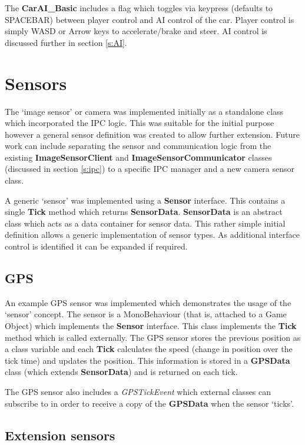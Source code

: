 \documentclass{article}
\begin{document}
The \textbf{CarAI\_Basic} includes a flag which toggles via keypress (defaults to SPACEBAR) between player control and AI control of the car. Player control is simply WASD or Arrow keys to accelerate/brake and steer. AI control is discussed further in section \ref{s:AI}.


\section{Sensors} \label{s:sensors}

The `image sensor' or camera was implemented initially as a standalone class which incorporated the IPC logic. This was suitable for the initial purpose however a general sensor definition was created to allow further extension. Future work can include separating the sensor and communication logic from the existing \textbf{ImageSensorClient} and \textbf{ImageSensorCommunicator} classes (discussed in section \ref{s:ipc}) to a specific IPC manager and a new camera sensor class.

A generic `sensor' was implemented using a \textbf{Sensor} interface. This contains a single \textbf{Tick} method which returns \textbf{SensorData}. \textbf{SensorData} is an abstract class which acts as a data container for sensor data. This rather simple initial definition allows a generic implementation of sensor types. As additional interface control is identified it can be expanded if required. 

\subsection{GPS}

An example GPS sensor was implemented which demonstrates the usage of the `sensor' concept. The sensor is a MonoBehaviour (that is, attached to a Game Object) which implements the \textbf{Sensor} interface. This class implements the \textbf{Tick} method which is called externally. The GPS sensor stores the previous position as a class variable and each \textbf{Tick} calculates the speed (change in position over the tick time) and updates the position. This information is stored in a \textbf{GPSData} class (which extends \textbf{SensorData}) and is returned on each tick.

The GPS sensor also includes a \textit{GPSTickEvent} which external classes can subscribe to in order to receive a copy of the \textbf{GPSData} when the sensor `ticks'.

\subsection{Extension sensors}
\end{document}
